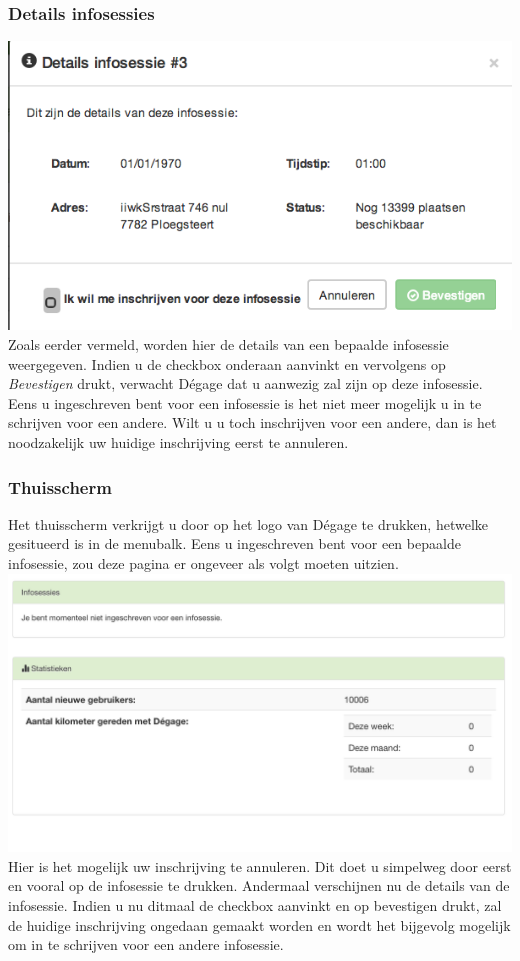 \documentclass[11pt,a4paper,oneside]{article}
\begin{document}
\subsubsection{Details infosessies} 


\includegraphics[scale=0.6]{img/details} \\
Zoals eerder vermeld, worden hier de details van een bepaalde infosessie weergegeven. Indien u de checkbox onderaan aanvinkt en vervolgens op \textit{Bevestigen} drukt, verwacht D\'egage dat u aanwezig zal zijn op deze infosessie. Eens u ingeschreven bent voor een infosessie is het niet meer mogelijk u in te schrijven voor een andere. Wilt u u toch inschrijven voor een andere, dan is het noodzakelijk uw huidige inschrijving eerst te annuleren.
\subsubsection{Thuisscherm}
Het thuisscherm verkrijgt u door op het logo van D\'egage te drukken, hetwelke gesitueerd is in de menubalk. Eens u ingeschreven bent voor een bepaalde infosessie, zou deze pagina er ongeveer als volgt moeten uitzien. \\
\includegraphics[scale=0.3]{img/home-autolener} \\
Hier is het mogelijk uw inschrijving te annuleren. Dit doet u simpelweg door eerst en vooral op de infosessie te drukken. Andermaal verschijnen nu de details van de infosessie. Indien u nu ditmaal de checkbox aanvinkt en op bevestigen drukt, zal de huidige inschrijving ongedaan gemaakt worden en wordt het bijgevolg mogelijk om in te schrijven voor een andere infosessie.
\end{document}
